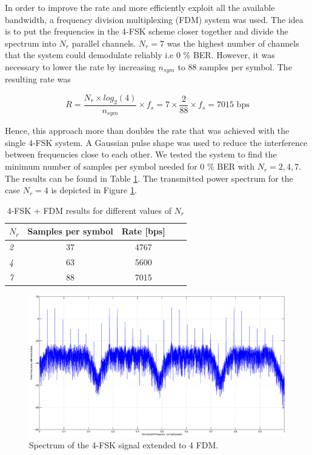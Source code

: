 \documentclass[12pt,a4paper,openright]{report}
\begin{document}
In order to improve the rate and more efficiently exploit all the available bandwidth, a frequency division multiplexing (FDM) system was used. The idea is to put the frequencies in the 4-FSK scheme closer together and divide the spectrum into \(N_r\) parallel channels. \(N_r = 7\) was the highest number of channels that the system could demodulate reliably i.e 0 \% BER. However, it was necessary to lower the rate by increasing \(n_{sym}\) to 88 samples per symbol. The resulting rate was

$$ R = \frac{N_r\times log_2(4)}{n_{sym}}\times f_s = 7 \times \frac{2}{88}\times f_s =7015 \text{ bps}$$


Hence, this approach more than doubles the rate that was achieved with the single 4-FSK system. A Gaussian pulse shape was used to reduce the interference between frequencies close to each other. We tested the system to find the minimum number of samples per symbol needed for 0 \% BER with \(N_r=2,4,7\).
The results can be found in Table \ref{table:FDM}. The transmitted power spectrum for the case \(N_r= 4\) is depicted in Figure \ref{fig:4FSKFDM}.

\begin{table} [h]
\centering
\begin{tabular}{lcccc} 
\(N_r\)	&  Samples per symbol  & Rate \textnormal{[bps]} \\
\hline
\emph{2}           & 37          & 4767       \\
\emph{4}        & 63           & 5600           \\
\emph{7}        & 88           & 7015           \\
\end{tabular}
\caption[Result of 4-FSK + FDM]{4-FSK + FDM results for different values of \(N_r\)}
\label{table:FDM}
\end{table}


\begin{figure}[H]
  \centering
    \includegraphics[width=1.0\textwidth]{4FDMspectrum.eps}
    \caption[4-FSK spectrum]{Spectrum of the 4-FSK signal extended to 4 FDM.}
    \label{fig:4FSKFDM}
\end{figure}
\end{document}
